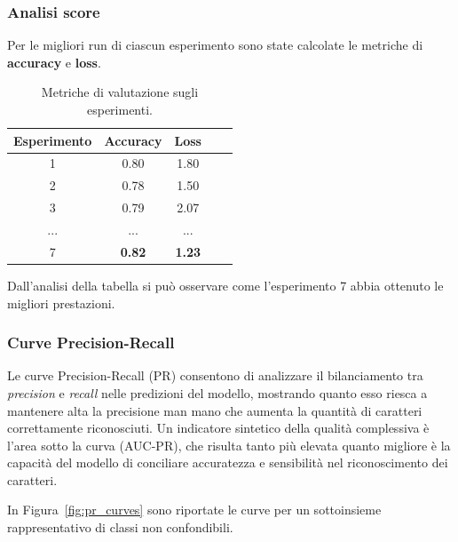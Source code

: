 \subsubsection*{Analisi score}
Per le migliori run di ciascun esperimento sono state calcolate le metriche di \textbf{accuracy} e \textbf{loss}.

\begin{table}[H]
\centering
\begin{tabular}{c|c|c|c|c}
\textbf{Esperimento} & \textbf{Accuracy} & \textbf{Loss} \\
\hline
1 & 0.80 & 1.80 \\
2 & 0.78 & 1.50 \\
3 & 0.79 & 2.07 \\
... & ... & ... \\
7 & \textbf{0.82} & \textbf{1.23} \\
\end{tabular}
\caption{Metriche di valutazione sugli esperimenti.}
\label{tab:score_analysis}
\end{table}

Dall'analisi della tabella si può osservare come l'esperimento 7 abbia ottenuto le migliori prestazioni.

\subsubsection*{Curve Precision-Recall}
\label{sec:pr_curves}
Le curve Precision-Recall (PR) consentono di analizzare il bilanciamento tra \emph{precision} e \emph{recall} nelle predizioni del modello, mostrando quanto esso riesca a mantenere alta la precisione man mano che aumenta la quantità di caratteri correttamente riconosciuti. Un indicatore sintetico della qualità complessiva è l'area sotto la curva (AUC-PR), che risulta tanto più elevata quanto migliore è la capacità del modello di conciliare accuratezza e sensibilità nel riconoscimento dei caratteri.

In Figura~\ref{fig:pr_curves} sono riportate le curve per un sottoinsieme rappresentativo di classi non confondibili.


